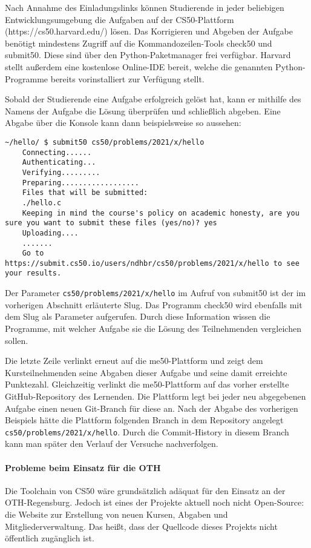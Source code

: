 Nach Annahme des Einladungslinks können Studierende in jeder beliebigen
Entwicklungsumgebung die Aufgaben auf der CS50-Plattform
(https://cs50.harvard.edu/) lösen. Das Korrigieren und Abgeben der Aufgabe
benötigt mindestens Zugriff auf die Kommandozeilen-Tools check50 und submit50.
Diese sind über den Python-Paketmanager frei verfügbar. Harvard stellt außerdem
eine kostenlose Online-IDE bereit, welche die genannten Python-Programme bereits
vorinstalliert zur Verfügung stellt.

Sobald der Studierende eine Aufgabe erfolgreich gelöst hat, kann er mithilfe des
Namens der Aufgabe die Lösung überprüfen und schließlich abgeben. Eine Abgabe
über die Konsole kann dann beispielsweise so aussehen:

\begin{lstlisting}[style=Bash]
    ~/hello/ $ submit50 cs50/problems/2021/x/hello
    Connecting......
    Authenticating...
    Verifying.........
    Preparing..................
    Files that will be submitted:
    ./hello.c
    Keeping in mind the course's policy on academic honesty, are you sure you want to submit these files (yes/no)? yes
    Uploading....
    .......
    Go to https://submit.cs50.io/users/ndhbr/cs50/problems/2021/x/hello to see your results.
\end{lstlisting}

Der Parameter \texttt{cs50/problems/2021/x/hello} im Aufruf von submit50 ist
der im vorherigen Abschnitt erläuterte Slug. Das Programm check50 wird ebenfalls
mit dem Slug als Parameter aufgerufen. Durch diese Information wissen die
Programme, mit welcher Aufgabe sie die Lösung des Teilnehmenden vergleichen
sollen.

Die letzte Zeile verlinkt erneut auf die me50-Plattform und zeigt dem
Kursteilnehmenden seine Abgaben dieser Aufgabe und seine damit erreichte
Punktezahl. Gleichzeitig verlinkt die me50-Plattform auf das vorher erstellte
GitHub-Repository des Lernenden. Die Plattform legt bei jeder neu abgegebenen
Aufgabe einen neuen Git-Branch für diese an. Nach der Abgabe des vorherigen
Beispiels hätte die Plattform folgenden Branch in dem Repository angelegt
\texttt{cs50/problems/2021/x/hello}. Durch die Commit-History in diesem Branch 
kann man später den Verlauf der Versuche nachverfolgen.

\paragraph{Probleme beim Einsatz für die OTH}
Die Toolchain von CS50 wäre grundsätzlich adäquat für den Einsatz an der
OTH-Regensburg. Jedoch ist eines der Projekte aktuell noch nicht Open-Source:
die Website zur Erstellung von neuen Kursen, Abgaben und Mitgliederverwaltung. 
Das heißt, dass der Quellcode dieses Projekts nicht öffentlich zugänglich ist.

